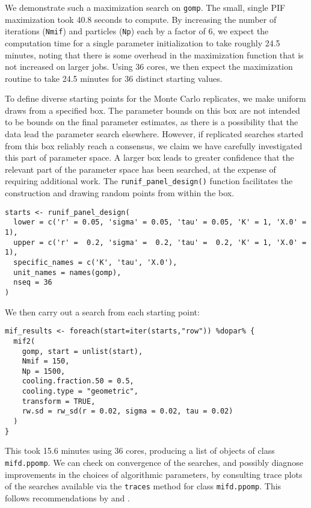 We demonstrate such a maximization search on \texttt{gomp}.
The small, single PIF maximization took 40.8 seconds to compute.
By increasing the number of iterations (\texttt{Nmif}) and particles (\texttt{Np}) each by a factor of \(6\), we expect the computation time for a single parameter initialization to take roughly 24.5 minutes, noting that there is some overhead in the maximization function that is not increased on larger jobs.
Using 36 cores, we then expect the maximization routine to take 24.5 minutes for 36 distinct starting values.

To define diverse starting points for the Monte Carlo replicates, we make uniform draws from a specified box.
The parameter bounds on this box are not intended to be bounds on the final parameter estimates, as there is a possibility that the data lead the parameter search elsewhere.
However, if replicated searches started from this box reliably reach a consensus, we claim we have carefully investigated this part of parameter space.
A larger box leads to greater confidence that the relevant part of the parameter space has been searched, at the expense of requiring additional work.
The \texttt{runif\_panel\_design()} function facilitates the construction and drawing random points from within the box.

\begin{verbatim}
starts <- runif_panel_design(
  lower = c('r' = 0.05, 'sigma' = 0.05, 'tau' = 0.05, 'K' = 1, 'X.0' = 1),
  upper = c('r' =  0.2, 'sigma' =  0.2, 'tau' =  0.2, 'K' = 1, 'X.0' = 1),
  specific_names = c('K', 'tau', 'X.0'),
  unit_names = names(gomp),
  nseq = 36
)
\end{verbatim}

\noindent We then carry out a search from each starting point:

\begin{verbatim}
mif_results <- foreach(start=iter(starts,"row")) %dopar% {
  mif2(
    gomp, start = unlist(start),
    Nmif = 150,
    Np = 1500,
    cooling.fraction.50 = 0.5,
    cooling.type = "geometric",
    transform = TRUE,
    rw.sd = rw_sd(r = 0.02, sigma = 0.02, tau = 0.02)
  )
}
\end{verbatim}

\noindent This took 15.6 minutes using 36 cores, producing a list of objects of class \texttt{mifd.ppomp}.
We can check on convergence of the searches, and possibly diagnose improvements in the choices of algorithmic parameters, by consulting trace plots of the searches available via the \texttt{traces} method for class \texttt{mifd.ppomp}.
This follows recommendations by \citet{ionides06} and \citet{king16}.


